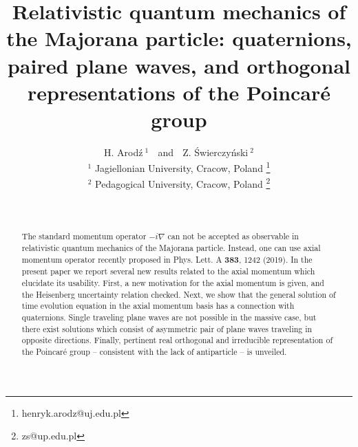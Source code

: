 \documentclass[12pt]{article}
\begin{document}
\title{Relativistic quantum mechanics of  the Majorana particle:  quaternions, paired plane waves, and orthogonal representations of the  Poincar\'e group } 



\author{H. Arod\'z$\:^1$ $\;$ and  $\;$  Z. \'Swierczy\'nski$\:^2$ \\ 
	{\small $^1$
Jagiellonian University, Cracow, Poland} \footnote{henryk.arodz@uj.edu.pl} \\ {\small $^2$ Pedagogical University, Cracow, Poland} \footnote{zs@up.edu.pl} }
\date{$\;$}

\maketitle

\vspace*{0.5cm}

\begin{abstract}
 The  standard momentum operator $-i \nabla$  can not be accepted as observable in relativistic quantum mechanics of the Majorana particle.   Instead, one can use  axial momentum operator recently proposed in Phys. Lett. A {\bf383},  1242 (2019).   In the present paper we report several  new results related to the axial momentum which elucidate its usability.  First, a new motivation  for the axial momentum  is given, and the Heisenberg  uncertainty relation  checked. Next, we show that the general solution of time evolution equation   in the axial momentum basis has a connection with quaternions.  Single traveling  plane waves  are not possible  in the massive case, but  there exist solutions  which consist of  asymmetric pair of  plane waves traveling in  opposite directions. Finally, pertinent real orthogonal and irreducible representation of the Poincar\'e group --  consistent with the lack of antiparticle -- is unveiled. 
\end{abstract} 


\vspace*{0.9cm}


\pagebreak
\end{document}
